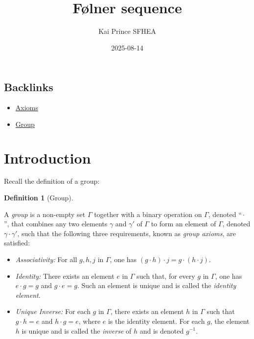 \documentclass[
  british,
]{article}
\title{Følner sequence}
\author{Kai Prince SFHEA}
\date{2025-08-14}
\providecommand{\tightlist}{%
  \setlength{\itemsep}{0pt}\setlength{\parskip}{0pt}}
\theoremstyle{definition}
\newtheorem{definition}{Definition}[section]
\theoremstyle{plain}
\theoremstyle{remark}
\newcommand{\GroupOperation}[2]{{#1}\cdot{#2}}
\newcommand{\Group}{{\Gamma}}
\newcommand{\Inverse}[1]{{#1}^{-1}}
\newcommand{\Identity}{{e}}
\newcommand{\GroupElement}{{\gamma}}
\begin{document}
\maketitle


\subsection*{Backlinks}\label{sec-Backlinks}

\begin{itemize}
\tightlist
\item
  \href{../template.html}{Axioms}
\item
  \href{template-group.html}{Group}
\end{itemize}

\section{Introduction}\label{introduction}

Recall the definition of a group:

\begin{definition}[Group]\protect\hypertarget{def-group-recall}{}\label{def-group-recall}

A \emph{group} is a non-empty set \(\Group\) together with a binary
operation on \(\Group\), denoted ``\(\GroupOperation{}{}\)'', that
combines any two elements \(\GroupElement\) and \(\GroupElement'\) of
\(\Group\) to form an element of \(\Group\), denoted
\(\GroupOperation{\GroupElement}{\GroupElement'}\), such that the
following three requirements, known as \emph{group axioms}, are
satisfied:

\begin{itemize}
\tightlist
\item
  \emph{Associativity:} For all \({g},{h},{j}\) in \(\Group\), one has
  \(\GroupOperation{(\GroupOperation{g}{h})}{j}=\GroupOperation{g}{(\GroupOperation{h}{j})}\).
\item
  \emph{Identity:} There exists an element \(\Identity\) in \(\Group\)
  such that, for every \({g}\) in \(\Group\), one has
  \(\GroupOperation{\Identity}{g}={g}\) and
  \(\GroupOperation{g}{\Identity}={g}\). Such an element is unique and
  is called the \emph{identity element}.
\item
  \emph{Unique Inverse:} For each \({g}\) in \(\Group\), there exists an
  element \({h}\) in \(\Group\) such that
  \(\GroupOperation{g}{h}=\Identity\) and
  \(\GroupOperation{h}{g}=\Identity\), where \(\Identity\) is the
  identity element. For each \({g}\), the element \({h}\) is unique and
  is called the \emph{inverse} of \({h}\) and is denoted
  \(\Inverse{g}\).
\end{itemize}

\end{definition}
\end{document}
